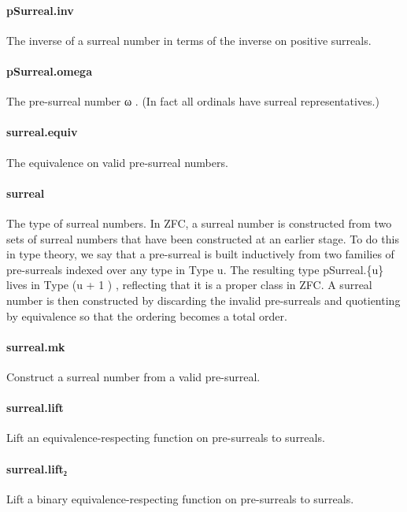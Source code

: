 \documentclass{article}
\begin{document}
\paragraph{pSurreal.inv}
\par
The inverse of a surreal number in terms of the inverse on
positive surreals.
\paragraph{pSurreal.omega}
\par
The pre-surreal number 
\colorbox[RGB]{253,246,227}{{{{\color[RGB]{101, 123, 131} ω }}}}. (In fact all ordinals have surreal
representatives.)
\paragraph{surreal.equiv}
\par
The equivalence on valid pre-surreal numbers.
\paragraph{surreal}
\par
The type of surreal numbers. In ZFC, a surreal number is constructed from
two sets of surreal numbers that have been constructed at an earlier
stage. To do this in type theory, we say that a pre-surreal is built
inductively from two families of pre-surreals indexed over any type
in Type u. The resulting type 
\colorbox[RGB]{253,246,227}{{{{\color[RGB]{101, 123, 131} pSurreal.\{u\} }}}} lives in 
\colorbox[RGB]{253,246,227}{{{{\color[RGB]{38, 139, 210} Type }}}{{{\color[RGB]{101, 123, 131}  (u }}}{{{\color[RGB]{181, 137, 0} + }}}{{{\color[RGB]{108, 113, 196} 1 }}}{{{\color[RGB]{101, 123, 131} ) }}}},
reflecting that it is a proper class in ZFC.
A surreal number is then constructed by discarding the invalid pre-surreals
and quotienting by equivalence so that the ordering becomes a total order.
\paragraph{surreal.mk}
\par
Construct a surreal number from a valid pre-surreal.
\paragraph{surreal.lift}
\par
Lift an equivalence-respecting function on pre-surreals to surreals.
\paragraph{surreal.lift₂}
\par
Lift a binary equivalence-respecting function on pre-surreals to surreals.
\end{document}
